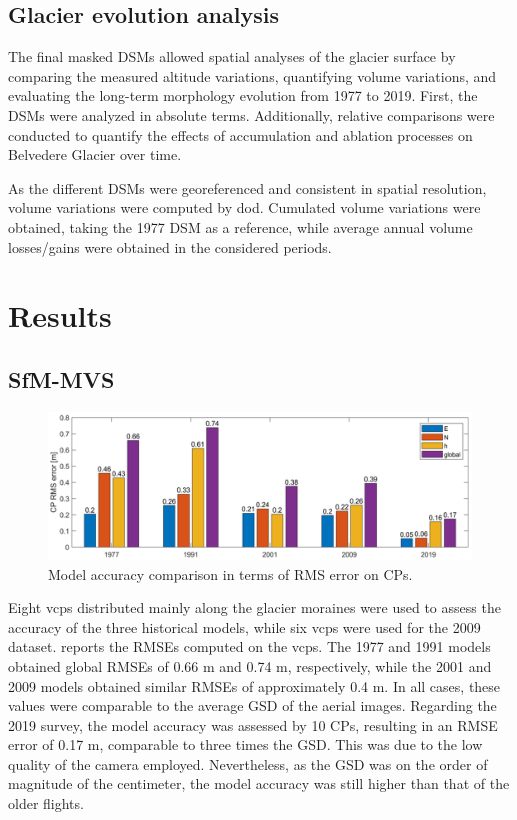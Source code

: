 \subsection{Glacier evolution analysis}\label{sec:2:glacier_evolution}

The final masked DSMs allowed spatial analyses of the glacier surface by comparing the measured altitude variations, quantifying volume variations, and evaluating the long-term morphology evolution from 1977 to 2019. 
First, the DSMs were analyzed in absolute terms.
Additionally, relative comparisons were conducted to quantify the effects of accumulation and ablation processes on Belvedere Glacier over time.

As the different DSMs were georeferenced and consistent in spatial resolution, volume variations were computed by \ac{dod}.
Cumulated volume variations were obtained, taking the 1977 DSM as a reference, while average annual volume losses/gains were obtained in the considered periods.

\section{Results}\label{sec:2:results}

\subsection{SfM-MVS}\label{sec:2:res_reconstruction}

\begin{figure}[ht]
    \centering
    \includegraphics[width=1\textwidth]{cp_error.png}
    \caption{Model accuracy comparison in terms of RMS error on CPs. }
    \label{fig:2:cp_error}
\end{figure}

Eight \acp{vcp} distributed mainly along the glacier moraines were used to assess the accuracy of the three historical models, while six \acp{vcp} were used for the 2009 dataset.
 reports the RMSEs computed on the \acp{vcp}.
The 1977 and 1991 models obtained global RMSEs of 0.66 m and 0.74 m, respectively, while the 2001 and 2009 models obtained similar RMSEs of approximately 0.4 m.
In all cases, these values were comparable to the average GSD of the aerial images. 
Regarding the 2019 survey, the model accuracy was assessed by 10 CPs, resulting in an RMSE error of 0.17 m, comparable to three times the GSD. 
This was due to the low quality of the camera employed. 
Nevertheless, as the GSD was on the order of magnitude of the centimeter, the model accuracy was still higher than that of the older flights.

